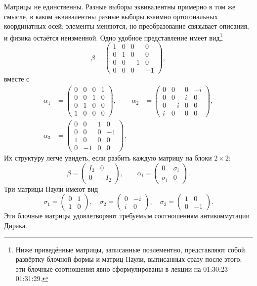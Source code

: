 Матрицы не единственны. Разные выборы эквивалентны примерно в том же смысле, в каком эквивалентны разные выборы взаимно ортогональных координатных осей: элементы меняются, но преобразование связывает описания, и физика остаётся неизменной. Одно удобное представление имеет вид\footnote{Ниже приведённые матрицы, записанные поэлементно, представляют собой развёртку блочной формы и матриц Паули, выписанных сразу после этого; эти блочные соотношения явно сформулированы в лекции на 01:30:23--01:31:29.}
\begin{equation}
\beta=
\begin{pmatrix}
1&0&0&0\\
0&1&0&0\\
0&0&-1&0\\
0&0&0&-1
\end{pmatrix},
\end{equation}
вместе с
\begin{align}
\alpha_1&=
\begin{pmatrix}
0&0&0&1\\
0&0&1&0\\
0&1&0&0\\
1&0&0&0
\end{pmatrix},
&
\alpha_2&=
\begin{pmatrix}
0&0&0&-i\\
0&0&i&0\\
0&-i&0&0\\
i&0&0&0
\end{pmatrix},
\\[1ex]
\alpha_3&=
\begin{pmatrix}
0&0&1&0\\
0&0&0&-1\\
1&0&0&0\\
0&-1&0&0
\end{pmatrix}.
\end{align}
Их структуру легче увидеть, если разбить каждую матрицу на блоки \(2\times2\):
\begin{equation}
\beta=
\begin{pmatrix}
I_2&0\\
0&-I_2
\end{pmatrix},
\qquad
\alpha_i=
\begin{pmatrix}
0&\sigma_i\\
\sigma_i&0
\end{pmatrix}.
\end{equation}
Три матрицы Паули имеют вид
\begin{equation}
\sigma_1=
\begin{pmatrix}
0&1\\
1&0
\end{pmatrix},
\quad
\sigma_2=
\begin{pmatrix}
0&-i\\
i&0
\end{pmatrix},
\quad
\sigma_3=
\begin{pmatrix}
1&0\\
0&-1
\end{pmatrix}.
\end{equation}
Эти блочные матрицы удовлетворяют требуемым соотношениям антикоммутации Дирака.


